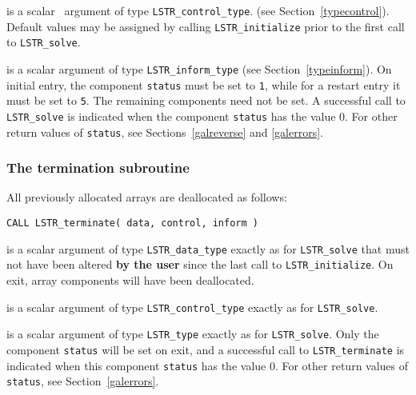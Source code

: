 \documentclass{galahad}
\newcommand{\packagename}{LS\-TR}
\begin{document}
\begin{description}
 is a scalar \intentin\ argument of type 
{\tt \packagename\_control\_type}. 
(see Section~\ref{typecontrol}). 
Default values may be assigned by calling {\tt \packagename\_initialize} 
prior to the first call to {\tt \packagename\_solve}.  
 
 is a scalar \intentinout argument of type 
{\tt \packagename\_inform\_type}
(see Section~\ref{typeinform}). 
On initial entry, the component {\tt status} must be set to {\tt 1},
while for a restart entry it must be set to {\tt 5}. 
The remaining components need not be set. 
A successful call to
{\tt \packagename\_solve}
is indicated when the  component {\tt status} has the value 0. 
For other return values of {\tt status}, see Sections~\ref{galreverse} 
and \ref{galerrors}.
\end{description}


\subsubsection{The  termination subroutine}
All previously allocated arrays are deallocated as follows:

\hskip0.5in 
{\tt CALL \packagename\_terminate( data, control, inform )}

\begin{description}

 is a scalar \intentinout argument of type 
{\tt \packagename\_data\_type} 
exactly as for
{\tt \packagename\_solve}
that must not have been altered {\bf by the user} since the last call to 
{\tt \packagename\_initialize}.
On exit, array components will have been deallocated. 

 is a scalar \intentin argument of type 
{\tt \packagename\_control\_type}
exactly as for
{\tt \packagename\_solve}.

 is a scalar \intentout argument of type {\tt \packagename\_type}
exactly as for
{\tt \packagename\_solve}.
Only the component {\tt status} will be set on exit, and a 
successful call to 
{\tt \packagename\_terminate}
is indicated when this  component {\tt status} has the value 0. 
For other return values of {\tt status}, see Section~\ref{galerrors}.

\end{description}

\end{document}
